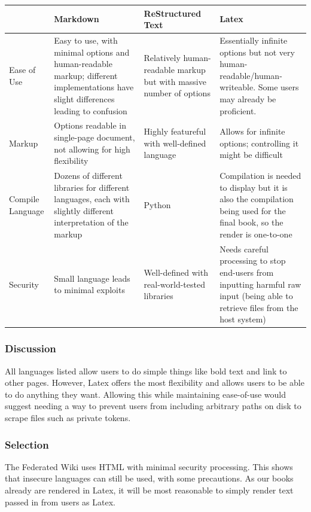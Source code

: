 \documentclass[onecolumn, draftclsnofoot,10pt, compsoc]{IEEEtran}
\begin{document}
{\tablehead{}
\begin{supertabular}{|p{2.5cm}|p{4.5cm}|p{4.5cm}|p{4.5cm}|}
\hline
	& Markdown
	& ReStructured Text
	& Latex \\
\hline
	Ease of Use
	& Easy to use, with minimal options and human-readable markup;
		different implementations have slight differences leading to confusion
	& Relatively human-readable markup but with massive number of options
	& Essentially infinite options but not very human-readable/human-writeable. Some users may already be proficient.  \\
\hline
	Markup
	& Options readable in single-page document, not allowing for high flexibility
	& Highly featureful with well-defined language
	& Allows for infinite options; controlling it might be difficult \\
\hline
	Compile Language
	& Dozens of different libraries for different languages,
		each with slightly different interpretation of the markup
	& Python
	& Compilation is needed to display but it is also the compilation being used for the final book, so the render is one-to-one \\
\hline
	Security
	& Small language leads to minimal exploits
	& Well-defined with real-world-tested libraries
	& Needs careful processing to stop end-users from inputting
		harmful raw input (being able to retrieve files from the host system)\\
\hline
\end{supertabular}

\medskip

\subsubsection{Discussion}
\noindent
All languages listed allow users to do simple things like bold text and link to other pages. However,
Latex offers the most flexibility and allows users to be able to do anything they want.
Allowing this while maintaining ease-of-use would suggest needing a way to prevent
users from including arbitrary paths on disk to scrape files such as private tokens.

\medskip

\subsubsection{Selection}
\noindent
The Federated Wiki uses HTML with minimal security processing. This shows that
insecure languages can still be used, with some precautions. As our books already
are rendered in Latex, it will be most reasonable to simply render text passed
in from users as Latex.










}
\end{document}
